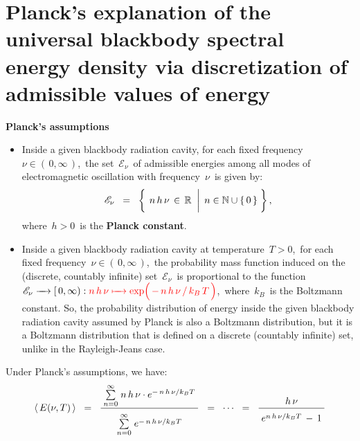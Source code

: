 
\vskip 0.5cm
\section{Planck's explanation of the universal blackbody spectral energy density via discretization of admissible values of energy}


\noindent
\textbf{Planck's assumptions}
\begin{itemize}
\item
    Inside a given blackbody radiation cavity,
    for each fixed frequency \,$\nu \in (\,0,\infty\,)$,\,
    the set \,$\mathscr{E}_{\nu}$\, of admissible energies
    among all modes of electromagnetic oscillation
    with frequency \,$\nu$\, is given by:
    \begin{equation*}
    \mathscr{E}_{\nu}
    \;\; = \;\;
        \left\{\;
            \left.
            \overset{{\color{white}1}}{
                n\,h\,\nu \,\in\, \Re
                }
            \;\;\right\vert\;
            n \in \N\cup\{\,0\,\}
            \;\right\},
    \end{equation*}
    where \,$h > 0$\, is the \textbf{\color{red}Planck constant}.
\item
    Inside a given blackbody radiation cavity at temperature \,$T > 0$,\,
    for each fixed frequency \,$\nu \in (\,0,\infty\,)$,\,
    the probability mass function induced
    on the (discrete, countably infinite) set
    \,$\mathscr{E}_{\nu}$\,
    is proportional to the function
    \,$
    \mathscr{E}_{\nu} \xrightarrow{{\color{white}....}} [\,0,\infty) :
    {\color{red}
    n\,h\,\nu
        \xmapsto{{\color{white}....}}
        \exp\!\left(\,\overset{{\color{white}.}}{-\,n\,h\,\nu\,/\,k_{B}\,T}\,\right)
    }
    $,\,
    where \,$k_{B}$\, is the Boltzmann constant.
    \vskip 0.01cm
    So, the probability distribution of energy inside the given blackbody radiation cavity
    assumed by Planck is also a Boltzmann distribution, but it is a Boltzmann distribution
    that is defined on a discrete (countably infinite) set, unlike in the Rayleigh-Jeans case.
\end{itemize}
\vskip 0.2cm
Under Planck's assumptions, we have:
\begin{equation*}
\langle\,E(\nu,T)\,\rangle
\;\; = \;\;
    \dfrac{
        {\color{white}.}
        \overset{\infty}{\underset{n=0}{\sum}}\;
        n\,h\,\nu \cdot e^{-\,n\,h\,\nu/k_{B}T}
        {\color{white}.}
        }{
        \overset{{\color{white}.}}{
            \overset{\infty}{\underset{n=0}{\sum}}\;
            e^{-\,n\,h\,\nu /k_{B}T}
            }
        }
\;\; = \;\;
    \cdots
\;\; = \;\;
    \dfrac{
        h\,\nu
        }{
        {\color{white}.}
        \overset{{\color{white}.}}{
            e^{n\,h\,\nu /k_{B}T} \, - \, 1
            }
        {\color{white}.}
        }
\end{equation*}
